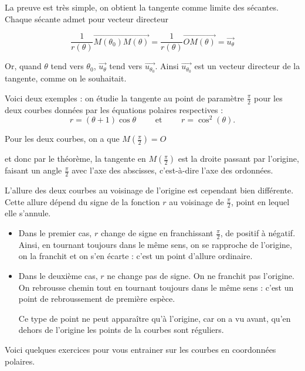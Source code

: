 \change

La preuve est très simple, on obtient la tangente comme limite des sécantes. 
Chaque sécante admet pour vecteur directeur 

$$\frac{1}{r(\theta)}\overrightarrow{M(\theta_0)M(\theta)}=
\frac{1}{r(\theta)}\overrightarrow{OM(\theta)}
=\overrightarrow{u_\theta}$$

\change
Or, quand $\theta$ 
tend vers $\theta_0$, $\overrightarrow{u_\theta}$ tend vers 
$\overrightarrow{u_{\theta_0}}$. Ainsi $\overrightarrow{u_{\theta_0}}$
est un vecteur directeur de la tangente, comme on le souhaitait.


\diapo

Voici deux exemples : on étudie la tangente 
au point de paramètre $\frac{\pi}{2}$ pour les deux courbes 
données par les équations polaires respectives :
$$r=(\theta+1)\cos \theta \qquad \text{ et } \qquad r=\cos^2(\theta).$$

\change

Pour les deux courbes, on a que $M(\frac{\pi}{2})=O$ 

\change
et  donc par le théorème, la tangente en $M(\frac{\pi}{2})$ est la droite passant par l'origine, 
faisant un angle $\frac{\pi}{2}$ avec l'axe des abscisses, c'est-à-dire l'axe des ordonnées.


L'allure des deux courbes au voisinage de l'origine est cependant 
bien différente. Cette allure dépend du signe de la fonction $r$ 
au voisinage de $\frac{\pi}{2}$, point en lequel elle s'annule.

\begin{itemize}
  \item Dans le premier cas, $r$ change de signe en franchissant 
$\frac{\pi}{2}$, de positif à négatif. Ainsi, en tournant toujours dans le même
sens, on se rapproche de l'origine, on la franchit et on 
s'en écarte : c'est un point d'allure ordinaire.
  
  \item Dans le deuxième cas, $r$ ne change pas de signe. 
On ne franchit pas l'origine. On rebrousse chemin tout en tournant
toujours dans le même sens : c'est un point de rebroussement de première espèce.

Ce type de point ne peut apparaître qu'à l'origine, car on a vu avant, qu'en dehors 
de l'origine les points de la courbes sont réguliers.
\end{itemize}


\diapo

Voici quelques exercices pour vous entrainer sur les courbes en coordonnées polaires.



